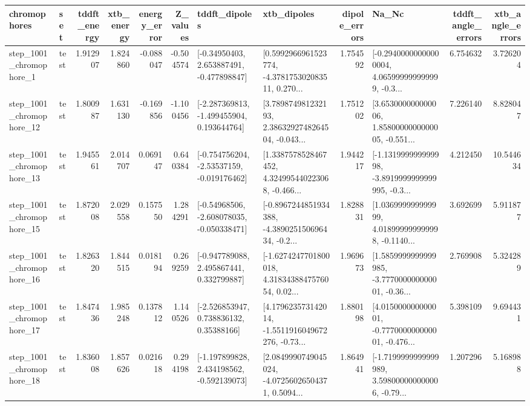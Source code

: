 \begin{tabular}{llrrrrllrlrr}
\toprule
             chromophores &       set &  tddft\_energy &  xtb\_energy &  energy\_error &  Z\_values &                               tddft\_dipoles &                                        xtb\_dipoles &  dipole\_errors &                                              Na\_Nc &  tddft\_angle\_errors &  xtb\_angle\_errors \\
\midrule
  step\_1001\_chromophore\_1 &      test &      1.912907 &    1.824860 &     -0.088047 & -0.504574 &    [-0.34950403, 2.653887491, -0.477898847] &  [0.5992966961523774, -4.378175302083511, 0.270... &       1.754592 &  [-0.29400000000000004, 4.065999999999999, -0.3... &            6.754632 &          3.726204 \\
 step\_1001\_chromophore\_12 &      test &      1.800987 &    1.631130 &     -0.169856 & -1.100456 &   [-2.287369813, -1.499455904, 0.193644764] &  [3.789874981232193, 2.3863292748264504, -0.043... &       1.751202 &  [3.653000000000006, 1.8580000000000005, -0.551... &            7.226140 &          8.828047 \\
 step\_1001\_chromophore\_13 &      test &      1.945561 &    2.014707 &      0.069147 &  0.640384 &   [-0.754756204, -2.53537159, -0.019176462] &  [1.3387578528467452, 4.324995440223068, -0.466... &       1.944217 &  [-1.131999999999998, -3.8919999999999995, -0.3... &            4.212450 &         10.544634 \\
 step\_1001\_chromophore\_15 &      test &      1.872008 &    2.029558 &      0.157550 &  1.284291 &   [-0.54968506, -2.608078035, -0.050338471] &  [-0.8967244851934388, -4.389025150696434, -0.2... &       1.828831 &  [1.036999999999999, 4.018999999999998, -0.1140... &            3.692699 &          5.911877 \\
 step\_1001\_chromophore\_16 &      test &      1.826320 &    1.844515 &      0.018194 &  0.269259 &    [-0.947789088, 2.495867441, 0.332799887] &  [-1.6274247701800018, 4.3183438847576054, 0.02... &       1.969673 &  [1.5859999999999985, -3.777000000000001, -0.36... &            2.769908 &          5.324289 \\
 step\_1001\_chromophore\_17 &      test &      1.847436 &    1.985248 &      0.137812 &  1.140526 &     [-2.526853947, 0.738836132, 0.35388166] &  [4.179623573142014, -1.5511916049672276, -0.73... &       1.880198 &  [4.015000000000001, -0.777000000000001, -0.476... &            5.398109 &          9.694431 \\
 step\_1001\_chromophore\_18 &      test &      1.836008 &    1.857626 &      0.021618 &  0.294198 &   [-1.197899828, 2.434198562, -0.592139073] &  [2.0849990749045024, -4.07256026504371, 0.5094... &       1.864941 &  [-1.7199999999999989, 3.598000000000006, -0.79... &            1.207296 &          5.168988 \\

\end{tabular}
